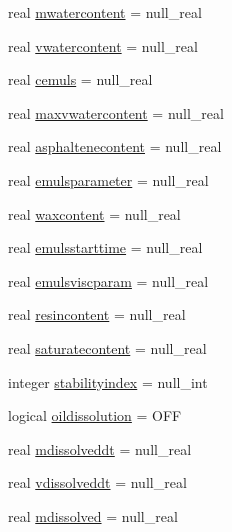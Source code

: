 \begin{DoxyCompactItemize}
\item 
real \mbox{\hyperlink{structmoduleoil__0d_1_1t__var_aaadc753eb2460c9b306104d362d36ab2}{mwatercontent}} = null\+\_\+real
\item 
real \mbox{\hyperlink{structmoduleoil__0d_1_1t__var_a3dc6333158a07b4baf008ec5835509f4}{vwatercontent}} = null\+\_\+real
\item 
real \mbox{\hyperlink{structmoduleoil__0d_1_1t__var_a3f83b84218b937c6c8bc0ae60890da0d}{cemuls}} = null\+\_\+real
\item 
real \mbox{\hyperlink{structmoduleoil__0d_1_1t__var_a59ce3b52723798dfd2e09e9e6e07809e}{maxvwatercontent}} = null\+\_\+real
\item 
real \mbox{\hyperlink{structmoduleoil__0d_1_1t__var_ae94e41990d3333b0dd1d8293cdd41518}{asphaltenecontent}} = null\+\_\+real
\item 
real \mbox{\hyperlink{structmoduleoil__0d_1_1t__var_a186c1e3a32f426323b299c985bf3552a}{emulsparameter}} = null\+\_\+real
\item 
real \mbox{\hyperlink{structmoduleoil__0d_1_1t__var_afae17e23cef39ca12c1f2d6438eb6a59}{waxcontent}} = null\+\_\+real
\item 
real \mbox{\hyperlink{structmoduleoil__0d_1_1t__var_a71f28c9a61370cc08e6fe9d6476c4ac4}{emulsstarttime}} = null\+\_\+real
\item 
real \mbox{\hyperlink{structmoduleoil__0d_1_1t__var_aaccbde44f06ae2776ca0e9a56dd097ba}{emulsviscparam}} = null\+\_\+real
\item 
real \mbox{\hyperlink{structmoduleoil__0d_1_1t__var_a28eec600179e8d7580174d7a7fcbcc07}{resincontent}} = null\+\_\+real
\item 
real \mbox{\hyperlink{structmoduleoil__0d_1_1t__var_aa60facfd22cacb04e838171b52dc1fbf}{saturatecontent}} = null\+\_\+real
\item 
integer \mbox{\hyperlink{structmoduleoil__0d_1_1t__var_a54bc7372f8bb6a9fa2a0f27995cce603}{stabilityindex}} = null\+\_\+int
\item 
logical \mbox{\hyperlink{structmoduleoil__0d_1_1t__var_a9dc1dc3cb2ea3b1d0144fb1622d401dc}{oildissolution}} = O\+FF
\item 
real \mbox{\hyperlink{structmoduleoil__0d_1_1t__var_ada50b9fe1b000812b0ed9bfbbf3b3eef}{mdissolveddt}} = null\+\_\+real
\item 
real \mbox{\hyperlink{structmoduleoil__0d_1_1t__var_a1e6f49556301c01b919461e0455cd3ff}{vdissolveddt}} = null\+\_\+real
\item 
real \mbox{\hyperlink{structmoduleoil__0d_1_1t__var_a9a67f6cc691952912be1de8353ef5c1c}{mdissolved}} = null\+\_\+real

\end{DoxyCompactItemize}
